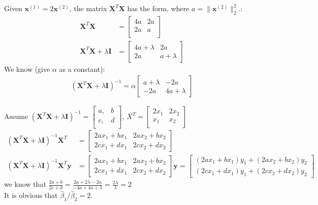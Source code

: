 \documentclass[a4paper,12pt]{article}
\begin{document}
Given \(\bm{x}^{(1)} = 2\bm{x}^{(2)}\), the matrix \(\bm{X}^T\bm{X}\) has the form, where \(a = \|\bm{x}^{(2)}\|_2^2\).:
\begin{align*}
    \bm{X}^T\bm{X} &= \begin{bmatrix}
        4a &2a \\
        2a &a \\
    \end{bmatrix} \\
    \bm{X}^T\bm{X} + \lambda\bm{I} &= \begin{bmatrix}
        4a+\lambda &2a  \\
        2a &a+\lambda
    \end{bmatrix}
\end{align*}
We know (give \(\alpha\) as a constant):
\begin{align*}
    (\bm{X}^T\bm{X} + \lambda\bm{I})^{-1} = \alpha \begin{bmatrix}
        a + \lambda &-2a \\
        -2a          &4a+\lambda
    \end{bmatrix}
\end{align*}

Assume \((\bm{X}^T\bm{X} + \lambda\bm{I})^{-1} = \begin{bmatrix}
    a, &b \\
    c, &d \\
\end{bmatrix}\),
\(X^T = \begin{bmatrix}
    2x_1 &2x_2 \\
    x_1 &x_2\\
\end{bmatrix}\)
\begin{align*}
    (\bm{X}^T\bm{X} + \lambda \bm{I})^{-1}\bm{X}^T &= \begin{bmatrix}
        2ax_1 + bx_1  &2ax_2 + bx_2 \\
        2cx_1 + dx_1  &2cx_2 + dx_2
    \end{bmatrix} \\
    (\bm{X}^T\bm{X} + \lambda \bm{I})^{-1}\bm{X}^T\bm{y} &= \begin{bmatrix}
        2ax_1 + bx_1  &2ax_2 + bx_2 \\
        2cx_1 + dx_1  &2cx_2 + dx_2
    \end{bmatrix}\bm{y} = \begin{bmatrix}
        (2ax_1 + bx_1)y_1 + (2ax_2 + bx_2)y_2 \\
        (2cx_1 + dx_1)y_1 + (2cx_2 + dx_2)y_2
    \end{bmatrix}
\end{align*}
we know that \(\frac{2a + b}{2c + d} = \frac{2a + 2\lambda - 2a}{-4a + 4a + \lambda} = \frac{2\lambda}{\lambda} = 2\) \\
It is obvious that \({\hat{\beta}_1} / {\hat{\beta}_2} = 2\).
\end{document}
